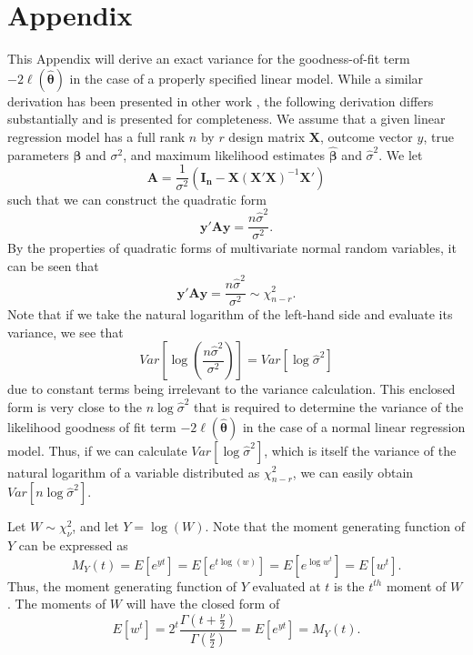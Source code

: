 \documentclass[review]{elsarticle}
\begin{document}
\section{Appendix}
This Appendix will derive an exact variance for the goodness-of-fit term $-2 \ell (\hat{\bm{\theta}} )$ in the case of a properly specified
linear model. While a similar derivation has been presented in other work \citep{McQuarrie}, the following derivation differs substantially and is presented for completeness.
We assume that a given linear regression model has a full rank $n$ by $r$ design matrix $\bm{X}$, outcome vector $y$, true parameters $\bm{\beta}$ and $\sigma^2$,
and maximum likelihood estimates $\hat{\bm{\beta}}$ and $\hat{\sigma}^2$. We let
\begin{equation*}
	\bm{A} = \frac{1}{\sigma^2} (\bm{I_n} - \bm{X}(\bm{X}'\bm{X})^{-1}\bm{X}') 
\end{equation*}
such that we can construct the quadratic form
\begin{equation*}
	\bm{y'Ay} = \frac{n \hat{\sigma}^2}{\sigma^2} .
\end{equation*}
By the properties of quadratic forms of multivariate normal random variables, it can be seen that
\begin{equation}
	\bm{y'Ay} = \frac{n \hat{\sigma}^2}{\sigma^2} \sim \chi^2_{n-r} .
\end{equation}
Note that if we take the natural logarithm of the left-hand side and evaluate its variance, we see that
\begin{equation}
	Var \left[ \log(\frac{n \hat{\sigma}^2}{\sigma^2}) \right]  = Var \left[ \log \hat{\sigma}^2 \right]
\end{equation}
due to constant terms being irrelevant to the variance calculation. This enclosed form is very close to the $n \log \hat{\sigma}^2$ that is required
to determine the variance of the likelihood goodness of fit term $-2 \ell (\hat{\bm{\theta}} )$ in the case of a normal linear regression model.
Thus, if we can calculate $Var \left[ \log \hat{\sigma}^2 \right]$, which is itself the variance
of the natural logarithm of a variable distributed as $\chi^2_{n-r}$, we can easily obtain $Var \left[ n \log \hat{\sigma}^2 \right]$.

Let $W \sim \chi^2_{\nu}$, and let $Y = \log(W)$. Note that the moment generating function of $Y$ can be expressed as
\begin{equation*}
	M_Y (t) = E \left[ e^{yt} \right] = E \left[ e^{t\log(w)} \right] = E \left[ e^{\log w^t} \right] = E \left[ w^t \right] .
\end{equation*}
Thus, the moment generating function of $Y$ evaluated at $t$ is the $t^{th}$ moment of $W$. The moments of $W$ will have the
closed form of
\begin{equation*}
	E \left[ w^t \right] = 2^t \frac{\Gamma (t + \frac{\nu}{2})}{\Gamma (\frac{\nu}{2})} = E \left[ e^{yt} \right] = M_Y (t) .
\end{equation*}
\end{document}
